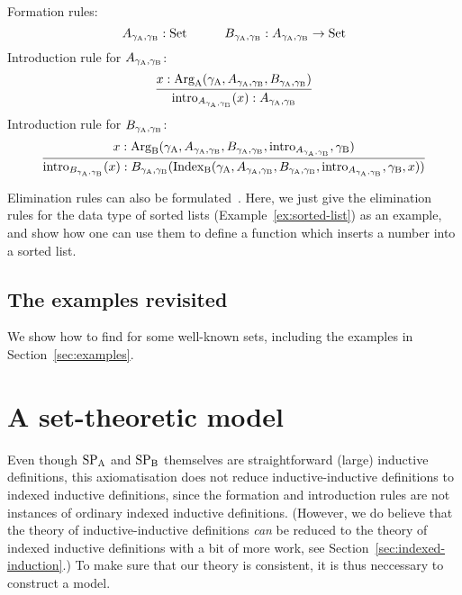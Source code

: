 \documentclass{article}
\begin{document}
Formation rules:
%
\[
A_{\gamma_{\mathrm{A}}, \gamma_{\mathrm{B}}} : \text{Set} \qquad\quad
B_{\gamma_{\mathrm{A}}, \gamma_{\mathrm{B}}} : A_{\gamma_{\mathrm{A}}, \gamma_{\mathrm{B}}} \to \text{Set}
\]
%
Introduction rule for $A_{\gamma_{\mathrm{A}}, \gamma_{\mathrm{B}}}$:
%
\[ %
\infer{\intro{A_{\gammaAB}}(x) : A_{\gammaAB}}{x : \ArgA(\gammaA, A_{\gammaAB}, B_{\gammaAB})}
\]
%
Introduction rule for $B_{\gamma_{\mathrm{A}}, \gamma_{\mathrm{B}}}$:
%
\[
\infer{\intro{B_{\gammaAB}}(x) : B_{\gammaAB}(\IndexB(\gammaA, A_{\gammaAB}, B_{\gammaAB}, \intro{A_{\gammaAB}}, \gammaB, x))}{x : \ArgB(\gammaA, A_{\gammaAB}, B_{\gammaAB}, \intro{A_{\gammaAB}}, \gammaB)}
\]
%

Elimination rules can also be
formulated~\cite{nordvallforsbergAltenkirchMorrisSetzer2011catsemindind}. Here,
we just give the elimination rules for the data type of sorted lists
(Example~\ref{ex:sorted-list}) as an example, and show how one can use them to
define a function which inserts a number into a sorted list.

\begin{example}
\blackqed
\end{example}

\subsection{The examples revisited}
\label{sec:examples-revisited}


We show how to find \gammaAB{} for some well-known sets, including the
examples in Section~\ref{sec:examples}.





\section{A set-theoretic model}
\label{sec:model}


Even though $\text{SP}_{\mathrm{A}}$ and $\text{SP}_{\mathrm{B}}$ themselves are straightforward (large)
inductive definitions, this axiomatisation does not reduce
inductive-inductive definitions to indexed inductive definitions,
since the formation and introduction rules are not instances of
ordinary indexed inductive definitions.  (However, we do believe that
the theory of inductive-inductive definitions \emph{can} be reduced to
the theory of indexed inductive definitions with a bit of more
work, %
see Section~\ref{sec:indexed-induction}.) To make sure that our theory
is consistent, it is thus neccessary to construct a model.
\end{document}
